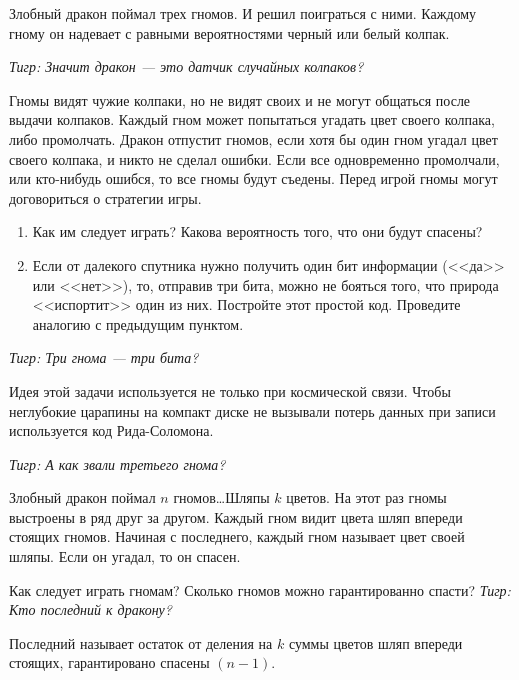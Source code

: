 \begin{problem}[Гномы]\par

Злобный дракон поймал трех гномов. И решил поиграться с ними. Каждому гному он надевает с равными вероятностями черный или белый колпак. \par

{\it Тигр: Значит дракон --- это датчик случайных колпаков?} \par

Гномы видят чужие колпаки, но не видят своих и не могут общаться после выдачи колпаков. Каждый гном может попытаться угадать цвет своего колпака, либо промолчать. Дракон отпустит гномов, если хотя бы один гном угадал цвет своего колпака, и никто не сделал ошибки. Если все одновременно промолчали, или кто-нибудь ошибся, то все гномы будут съедены. Перед игрой гномы могут договориться о стратегии игры.\par

\begin{enumerate}
\item Как им следует играть? Какова вероятность того, что они будут спасены?\par
\item Если от далекого спутника нужно получить один бит информации (<<да>> или <<нет>>), то, отправив три бита, можно не бояться того, что природа <<испортит>> один из них. Постройте этот простой код. Проведите аналогию с предыдущим пунктом.
\end{enumerate}

{\it Тигр: Три гнома --- три бита?}\par

Идея этой задачи используется не только при космической связи. Чтобы неглубокие царапины на компакт диске не вызывали потерь данных при записи используется код Рида-Соломона.\par
{\it Тигр: А как звали третьего гнома?}\par



\begin{sol}

\end{sol}
\end{problem}



\begin{problem}\par
Злобный дракон поймал  $n$  гномов\ldots Шляпы $k$ цветов. На этот раз гномы выстроены в ряд друг за другом. Каждый гном видит цвета шляп впереди стоящих гномов. Начиная с последнего, каждый гном называет цвет своей шляпы. Если он угадал, то он спасен.\par

Как следует играть гномам? Сколько гномов можно гарантированно спасти?
{\it Тигр: Кто последний к дракону?}

\begin{sol}
Последний называет остаток от деления на $k$ суммы цветов шляп впереди стоящих, гарантировано спасены $(n-1)$.
\end{sol}

\end{problem}



